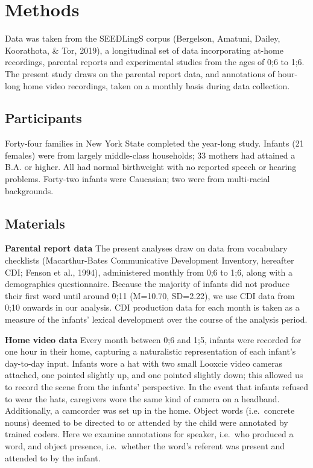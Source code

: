 \documentclass[man,floatsintext]{apa6}
\begin{document}
\hypertarget{methods}{%
\section{Methods}\label{methods}}

Data was taken from the SEEDLingS corpus (Bergelson, Amatuni, Dailey, Koorathota, \& Tor, 2019), a longitudinal set of data incorporating at-home recordings, parental reports and experimental studies from the ages of 0;6 to 1;6. The present study draws on the parental report data, and annotations of hour-long home video recordings, taken on a monthly basis during data collection.

\hypertarget{participants}{%
\subsection{Participants}\label{participants}}

Forty-four families in New York State completed the year-long study. Infants (21 females) were from largely middle-class households; 33 mothers had attained a B.A. or higher. All had normal birthweight with no reported speech or hearing problems. Forty-two infants were Caucasian; two were from multi-racial backgrounds.

\hypertarget{materials}{%
\subsection{Materials}\label{materials}}

\textbf{Parental report data} The present analyses draw on data from vocabulary checklists (Macarthur-Bates Communicative Development Inventory, hereafter CDI; Fenson et al., 1994), administered monthly from 0;6 to 1;6, along with a demographics questionnaire. Because the majority of infants did not produce their first word until around 0;11 (M=10.70, SD=2.22), we use CDI data from 0;10 onwards in our analysis. CDI production data for each month is taken as a measure of the infants' lexical development over the course of the analysis period.

\textbf{Home video data} Every month between 0;6 and 1;5, infants were recorded for one hour in their home, capturing a naturalistic representation of each infant's day-to-day input. Infants wore a hat with two small Looxcie video cameras attached, one pointed slightly up, and one pointed slightly down; this allowed us to record the scene from the infants' perspective. In the event that infants refused to wear the hats, caregivers wore the same kind of camera on a headband. Additionally, a camcorder was set up in the home. Object words (i.e.~concrete nouns) deemed to be directed to or attended by the child were annotated by trained coders. Here we examine annotations for speaker, i.e.~who produced a word, and object presence, i.e.~whether the word's referent was present and attended to by the infant.
\end{document}
